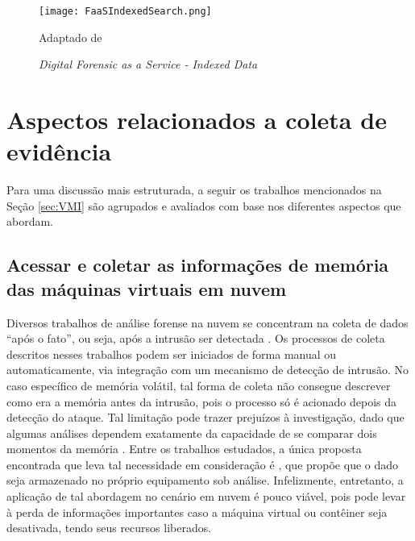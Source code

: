 \begin{figure}[htb!]
\footnotesize
\caption{\textit{Digital Forensic as a Service - Indexed Data}}
\texttt{[image: FaaSIndexedSearch.png]}
\centering
\label{fig:FaaSIndexedSearch}
\begin{center}
Adaptado de \cite{FaaSIndexedSearch:2012} 
\end{center}
\end{figure}


\section{Aspectos relacionados a coleta de evidência}
\label{sec:coletadeevidencia}

Para uma discussão mais estruturada, a seguir os trabalhos mencionados na Seção \ref{sec:VMI} são agrupados e avaliados com base nos diferentes aspectos que abordam.

\subsection{Acessar e coletar as informações de memória das máquinas virtuais em nuvem}
\label{sec:coletadeevidencia}

Diversos trabalhos de análise forense na nuvem se concentram na coleta de dados ``após o fato'', ou seja, após a intrusão ser detectada \cite{ReichertAutoAcquisition:2015,PoiselVMI:2013,DykstraFROST:2013,GeorgeDF2CE:2012,SangLogApproach:2013}. 
%
Os processos de coleta descritos nesses trabalhos podem ser iniciados de forma manual ou automaticamente, via integração com um mecanismo de detecção de intrusão. 
%
No caso específico de memória volátil, tal forma de coleta não consegue descrever como era a memória antes da intrusão, pois o processo só é acionado depois da detecção do ataque. 
%
Tal limitação pode trazer prejuízos à investigação, dado que algumas análises dependem exatamente da capacidade de se comparar dois momentos da memória \cite{CaseMemoryForensics:2014}. 
%
Entre os trabalhos estudados, a única proposta encontrada que leva tal necessidade em consideração é \cite{DezfouliBackupApproach:2012}, que propõe que o dado seja armazenado no próprio equipamento sob análise.
%
Infelizmente, entretanto, a aplicação de tal abordagem no cenário em nuvem é pouco viável, pois pode levar à perda de informações importantes caso a máquina virtual ou contêiner seja desativada, tendo seus recursos liberados.
%

